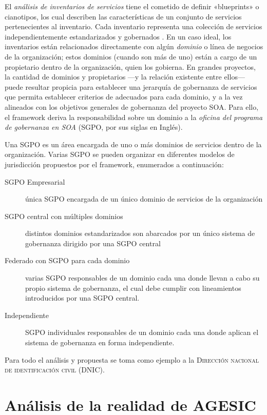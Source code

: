 \documentclass[11pt]{article}
\begin{document}
			El \emph{análisis de inventarios de servicios} tiene el cometido de definir «blueprints» o cianotipos, los cual describen las características de un conjunto de servicios pertenecientes al inventario. Cada inventario representa una colección de servicios independientemente estandarizados y gobernados \cite{Erl:2011:SGG:1983453}. En un caso ideal, los inventarios están relacionados directamente con algún \emph{dominio} o línea de negocios de la organización; estos dominios (cuando son más de uno) están a cargo de un propietario dentro de la organización, quien los gobierna. En grandes proyectos, la cantidad de dominios y propietarios —y la relación existente entre ellos— puede resultar propicia para establecer una jerarquía de gobernanza de servicios que permita establecer criterios de adecuados para cada dominio, y a la vez alineados con los objetivos generales de gobernanza del proyecto SOA. Para ello, el framework deriva la responsabilidad sobre un dominio a la \emph{oficina del programa de gobernanza en SOA} (SGPO, por sus siglas en Inglés).

			Una SGPO es un área encargada de uno o más dominios de servicios dentro de la organización. Varias SGPO se pueden organizar en diferentes modelos de jurisdicción propuestos por el framework, enumerados a continuación:

			\begin{description}
				\item[SGPO Empresarial] única SGPO encargada de un único dominio de servicios de la organización
				\item[SGPO central con múltiples dominios] distintos dominios estandarizados son abarcados por un único sistema de gobernanza dirigido por una SGPO central
				\item[Federado con SGPO para cada dominio] varias SGPO responsables de un dominio cada una donde llevan a cabo su propio sistema de gobernanza, el cual debe cumplir con lineamientos introducidos por una SGPO central.
				\item[Independiente] SGPO individuales responsables de un dominio cada una donde aplican el sistema de gobernanza en forma independiente.

			\end{description}

			Para todo el análisis y propuesta se toma como ejemplo a la \textsc{Dirección nacional de identificación civil (DNIC)}.

	\section{Análisis de la realidad de AGESIC}
\end{document}
